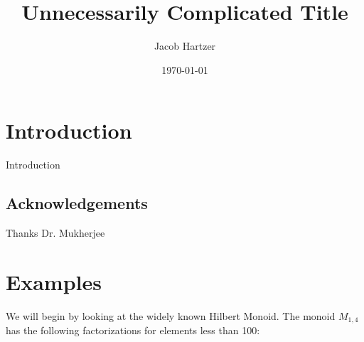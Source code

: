 \documentclass[12pt,reqno]{amsart}
\theoremstyle{definition}
\begin{document}


\mbox{}
\title{Unnecessarily Complicated Title\qquad}
\author{Jacob Hartzer}
\address{Honors Project\\Mechanical Engineering\\Texas A\&M University \newline College Station, TX 77843}

\date{\today}

\begin{abstract}
\hspace{-2.05032pt}



\end{abstract}
\maketitle

\vspace{-1cm}


\section{Introduction}%
\label{s:intro}%
Introduction


\subsection*{Acknowledgements}
Thanks Dr. Mukherjee

\newpage\vspace{0pt}
\section{Examples}%
\label{s:Periodicity}%
We will begin by looking at the widely known Hilbert Monoid. The monoid $M_{1,4}$ has the following factorizations for elements less than 100:\newline
\end{document}
